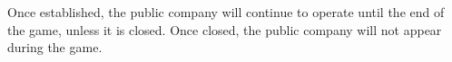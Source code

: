 \documentclass{article}
\begin{document}
\begin{CJK}{UTF8}{min}
Once established, the public company will continue to operate until
the end of the game, unless it is closed. Once closed, the public
company will not appear during the game.
















\end{CJK}
\end{document}
